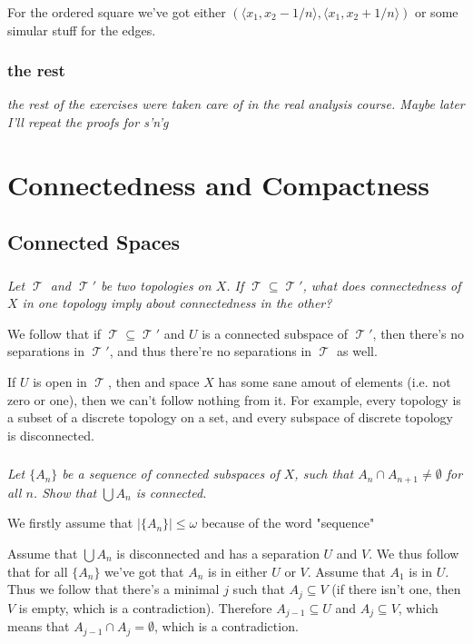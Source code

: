 \documentclass[11pt,oneside,titlepage]{book}
\DeclareMathOperator \topol {\mathcal {T}}
\newcommand{\eangle}[1]{\langle #1 \rangle}
\newcommand{\set}[1]{\{ #1 \}}
\begin{document}
For the ordered square we've got either $(\eangle{x_1, x_2 - 1/n}, \eangle{x_1, x_2 +  1/n})$
or some simular stuff for the edges.

\subsection*{the rest}

\textit{the rest of the exercises were taken care of in the real analysis course. Maybe later
  I'll repeat the proofs for s'n'g}

\chapter{Connectedness and Compactness}

\section{Connected Spaces}

\subsection{}

\textit{Let $\topol$ and $\topol'$ be two topologies on $X$. If $\topol \subseteq \topol'$, what
  does connectedness of $X$ in one topology imply about connectedness in the other?}

We follow that if $\topol \subseteq \topol'$ and $U$ is a connected subspace of $\topol'$,
then there's no separations in $\topol'$, and thus there're no separations in $\topol$ as well.

If $U$ is open in $\topol$, then and space $X$ has some sane amout of elements (i.e. not zero or
one), then we can't follow nothing from it. For example, every topology is a subset
of a discrete topology on a set, and every subspace of discrete topology is disconnected.

\subsection{}

\textit{Let $\set{A_n}$ be a sequence of connected subspaces of $X$, such that
  $A_n \cap A_{n + 1} \neq \emptyset$ for all $n$. Show that $\bigcup{A_n}$ is connected.}

We firstly assume that $|\set{A_n}| \leq \omega$ because of the word "sequence"

Assume that $\bigcup{A_n}$ is disconnected and has a separation $U$ and $V$.
We thus follow that for all $\set{A_n}$ we've got that $A_n$ is in either $U$ or $V$.
Assume that $A_1$ is in $U$. Thus we follow that there's a minimal $j$ such
that $A_j \subseteq V$ (if there isn't one, then $V$ is empty, which is a contradiction).
Therefore $A_{j - 1} \subseteq U$ and $A_j \subseteq V$, which means that
$A_{j - 1} \cap A_{j} = \emptyset$, which is a contradiction.
\end{document}
